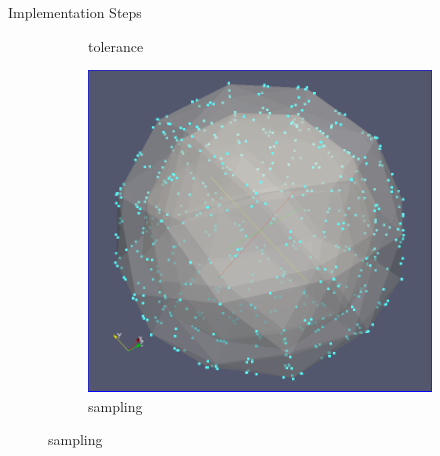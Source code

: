 \documentclass{beamer}
\begin{document}
\begin{frame} {Implementation Steps}
\begin{figure}[h]
\begin{subfigure}[b]{0.23\textwidth}
      \caption[2]{ tolerance}
    \end{subfigure}
    \begin{subfigure}[b]{0.23\textwidth}
      \includegraphics[width=\textwidth]{sampling}
      \caption[3]{sampling}
    \end{subfigure}


\end{figure}
\end{frame}
\end{document}
